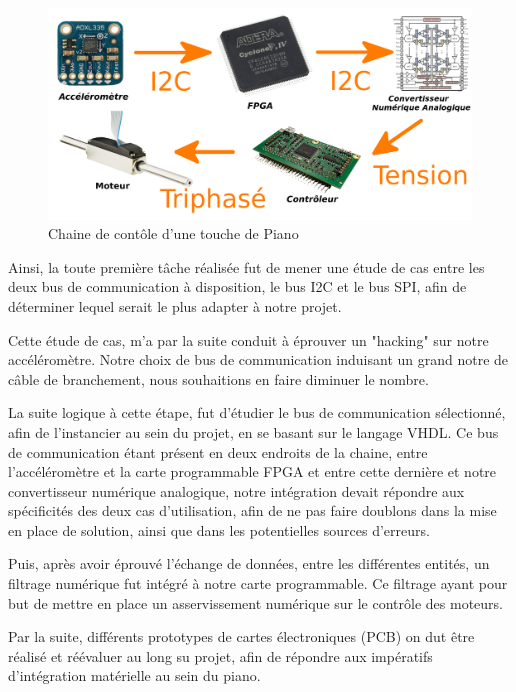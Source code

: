 \documentclass[french,a4paper,12pt]{report}
\begin{document}
	\begin{figure}[!ht]
    \center
  	\includegraphics[width=17cm]{CH.png}
    \caption{Chaine de contôle d'une touche de Piano}
	\end{figure}	
	
	Ainsi, la toute première tâche réalisée fut de mener une étude de cas entre les deux bus de communication à disposition, le bus I2C et le bus SPI, afin de déterminer lequel serait le plus adapter à notre projet.
	
	Cette étude de cas, m'a par la suite conduit à éprouver un "hacking" sur notre accéléromètre. Notre choix de bus de communication induisant un grand notre de câble de branchement, nous souhaitions en faire diminuer le nombre.
	
	La suite logique à cette étape, fut d'étudier le bus de communication sélectionné, afin de l'instancier au sein du projet, en se basant sur le langage VHDL. Ce bus de communication étant présent en deux endroits de la chaine, entre l'accéléromètre et la carte programmable FPGA et entre cette dernière et notre convertisseur numérique analogique, notre intégration devait répondre aux spécificités des deux cas d'utilisation, afin de ne pas faire doublons dans la mise en place de solution, ainsi que dans les potentielles sources d'erreurs.
	
	Puis, après avoir éprouvé l'échange de données, entre les différentes entités, un filtrage numérique fut intégré à notre carte programmable. Ce filtrage ayant pour but de mettre en place un asservissement numérique sur le contrôle des moteurs.
	

	Par la suite, différents prototypes de cartes électroniques (PCB) on dut être réalisé et réévaluer au long su projet, afin de répondre aux impératifs d'intégration matérielle au sein du piano.
	
\end{document}
